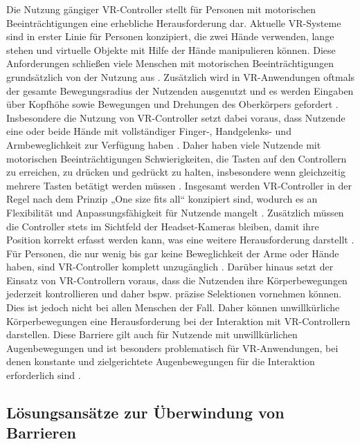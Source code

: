Die Nutzung gängiger VR-Controller stellt für Personen mit motorischen Beeinträchtigungen eine erhebliche Herausforderung dar. Aktuelle VR-Systeme sind in erster Linie für Personen konzipiert, die zwei Hände verwenden, lange stehen und virtuelle Objekte mit Hilfe der Hände manipulieren können. Diese Anforderungen schließen viele Menschen mit motorischen Beeinträchtigungen grundsätzlich von der Nutzung aus \citep{dombrowski_designing_2019}. Zusätzlich wird in VR-Anwendungen oftmals der gesamte Bewegungsradius der Nutzenden ausgenutzt und es werden Eingaben über Kopfhöhe sowie Bewegungen und Drehungen des Oberkörpers gefordert \citep{gerling_critical_2021}. Insbesondere die Nutzung von VR-Controller setzt dabei voraus, dass Nutzende eine oder beide Hände mit vollständiger Finger-, Handgelenks- und Armbeweglichkeit zur Verfügung haben \citep{mott_accessible_2019}. Daher haben viele Nutzende mit motorischen Beeinträchtigungen Schwierigkeiten, die Tasten auf den Controllern zu erreichen, zu drücken und gedrückt zu halten, insbesondere wenn gleichzeitig mehrere Tasten betätigt werden müssen \citep{mott_i_2020}. Insgesamt werden VR-Controller in der Regel nach dem Prinzip „One size fits all“ konzipiert sind, wodurch es an Flexibilität und Anpassungsfähigkeit für Nutzende mangelt \citep{creed_inclusive_2023}. Zusätzlich müssen die Controller stets im Sichtfeld der Headset-Kameras bleiben, damit ihre Position korrekt erfasst werden kann, was eine weitere Herausforderung darstellt \citep{mott_i_2020}. Für Personen, die nur wenig bis gar keine Beweglichkeit der Arme oder Hände haben, sind VR-Controller komplett unzugänglich \citep{mott_i_2020}. Darüber hinaus setzt der Einsatz von VR-Controllern voraus, dass die Nutzenden ihre Körperbewegungen jederzeit kontrollieren und daher bspw. präzise Selektionen vornehmen können. Dies ist jedoch nicht bei allen Menschen der Fall. Daher können unwillkürliche Körperbewegungen eine Herausforderung bei der Interaktion mit VR-Controllern darstellen. Diese Barriere gilt auch für Nutzende mit unwillkürlichen Augenbewegungen und ist besonders problematisch für VR-Anwendungen, bei denen konstante und zielgerichtete Augenbewegungen für die Interaktion erforderlich sind \citep{creed_inclusive_2023}. 

\subsection{Lösungsansätze zur Überwindung von Barrieren}

